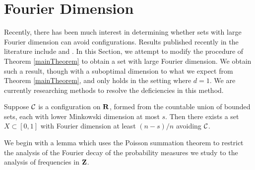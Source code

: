 \section{Fourier Dimension}

Recently, there has been much interest in determining whether sets with large Fourier dimension can avoid configurations. Results published recently in the literature include \cite{PramanikLaba} and \cite{Shmerkin}. In this Section, we attempt to modify the procedure of Theorem \ref{mainTheorem} to obtain a set with large Fourier dimension. We obtain such a result, though with a suboptimal dimension to what we expect from Theorem \ref{mainTheorem}, and only holds in the setting where $d = 1$. We are currently researching methods to resolve the deficiencies in this method.

\begin{theorem} \label{FourierTheorem}
    Suppose $\operatorname{\mathcal{C}}$ is a configuration on $\operatorname{\mathbf{R}}$, formed from the countable union of bounded sets, each with lower Minkowski dimension at most $s$. Then there exists a set $X \subset [0,1]$ with Fourier dimension at least $(n - s)/n$ avoiding $\operatorname{\mathcal{C}}$.
\end{theorem}

We begin with a lemma which uses the Poisson summation theorem to restrict the analysis of the Fourier decay of the probability measures we study to the analysis of frequencies in $\operatorname{\mathbf{Z}}$.


